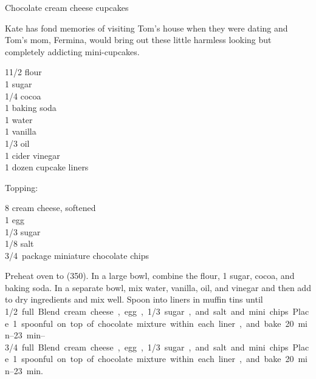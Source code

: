 \begin{entry}{Chocolate cream cheese cupcakes}

\begin{open}
  Kate has fond memories of visiting Tom's house when they were dating and
  Tom's mom, Fermina, would bring out these little harmless looking but
  completely addicting mini-cupcakes.
\end{open}
\begin{ingredients}
    1\SI{1/2}{\cup} flour\\
    \SI{1}{\cup} sugar\\
    \SI{1/4}{\cup} cocoa\\
    \SI{1}{\teaspoon} baking soda\\
    \SI{1}{\cup} water\\
    \SI{1}{\teaspoon} vanilla\\
    \SI{1/3}{\cup} oil\\
    \SI{1}{\tblspoon} cider vinegar\\
    1 dozen cupcake liners\\
\end{ingredients}

Topping:
\begin{ingredients}
    \SI{8}{\ounce} cream cheese, softened\\
    1 egg\\
    \SI{1/3}{\cup} sugar\\
    \SI{1/8}{\teaspoon} salt\\
    \SI{3/4}{package} miniature chocolate chips\\
\end{ingredients}
Preheat oven to (\SI{350}{\degreeF}). In a large bowl, combine the flour,
\SI{1}{\cup} sugar, cocoa, and baking soda. In a separate bowl, mix water,
vanilla, oil, and vinegar and then add to dry ingredients and mix well. Spoon
into liners in muffin tins until \SIrange{1/2}{3/4} full. Blend cream cheese,
egg, \SI{1/3}{\cup} sugar, and salt and mini chips. Place 1 spoonful on top of
chocolate mixture within each liner, and bake \SIrange{20}{23}{\minute}.
\end{entry}

